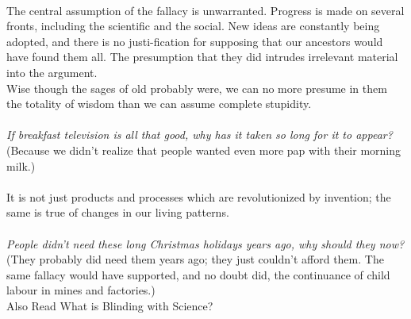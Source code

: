 \documentclass[a4paper,12pt,single,pdftex]{scrartcl}
\begin{document}
    \\

    
      The central assumption of the fallacy is unwarranted. Progress is made on several fronts, including the scientific and the social. New ideas are constantly being adopted, and there is no justi-fication for supposing that our ancestors would have found them all. The presumption that they did intrudes irrelevant material into the argument.
    \\

    
      Wise though the sages of old probably were, we can no more presume in them the totality of wisdom than we can assume complete stupidity.
    \\

    
       
    \\

    
      {\em If breakfast television is all that good, why has it taken so long for it to appear?}
    \\

    
      (Because we didn’t realize that people wanted even more pap with their morning milk.)
    \\

    
       
    \\

    
      It is not just products and processes which are revolutionized by invention; the same is true of changes in our living patterns.
    \\

    
       
    \\

    
      {\em People didn’t need these long Christmas holidays years ago, why should they now?}
    \\

    
      (They probably did need them years ago; they just couldn’t afford them. The same fallacy would have supported, and no doubt did, the continuance of child labour in mines and factories.)
    \\

    
      

      
        Also Read  What is Blinding with Science?
      
    
    
       
    \\
\end{document}
